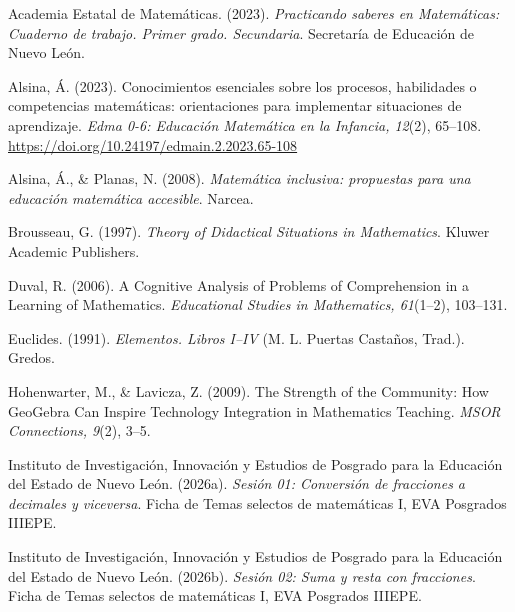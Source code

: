 \documentclass[spanish,letterpaper,oneside]{article}
\begin{document}
{\small{}\setlength{\parskip}{5pt}
\par\hangindent=1.27cm Academia Estatal de Matemáticas. (2023). \textit{Practicando saberes en Matemáticas: Cuaderno de trabajo. Primer grado. Secundaria}. Secretaría de Educación de Nuevo León.

\par\hangindent=1.27cm Alsina, Á. (2023). Conocimientos esenciales sobre los procesos, habilidades o competencias matemáticas: orientaciones para implementar situaciones de aprendizaje. \textit{Edma 0-6: Educación Matemática en la Infancia, 12}(2), 65--108. \url{https://doi.org/10.24197/edmain.2.2023.65-108}

\par\hangindent=1.27cm Alsina, Á., \& Planas, N. (2008). \textit{Matemática inclusiva: propuestas para una educación matemática accesible}. Narcea.

\par\hangindent=1.27cm Brousseau, G. (1997). \textit{Theory of Didactical Situations in Mathematics}. Kluwer Academic Publishers.

\par\hangindent=1.27cm Duval, R. (2006). A Cognitive Analysis of Problems of Comprehension in a Learning of Mathematics. \textit{Educational Studies in Mathematics, 61}(1--2), 103--131.

\par\hangindent=1.27cm Euclides. (1991). \textit{Elementos. Libros I--IV} (M. L. Puertas Castaños, Trad.). Gredos.

\par\hangindent=1.27cm Hohenwarter, M., \& Lavicza, Z. (2009). The Strength of the Community: How GeoGebra Can Inspire Technology Integration in Mathematics Teaching. \textit{MSOR Connections, 9}(2), 3--5.

\par\hangindent=1.27cm Instituto de Investigación, Innovación y Estudios de Posgrado para la Educación del Estado de Nuevo León. (2026a). \textit{Sesión 01: Conversión de fracciones a decimales y viceversa}. Ficha de Temas selectos de matemáticas I, EVA Posgrados IIIEPE.

\par\hangindent=1.27cm Instituto de Investigación, Innovación y Estudios de Posgrado para la Educación del Estado de Nuevo León. (2026b). \textit{Sesión 02: Suma y resta con fracciones}. Ficha de Temas selectos de matemáticas I, EVA Posgrados IIIEPE.

}
\end{document}
